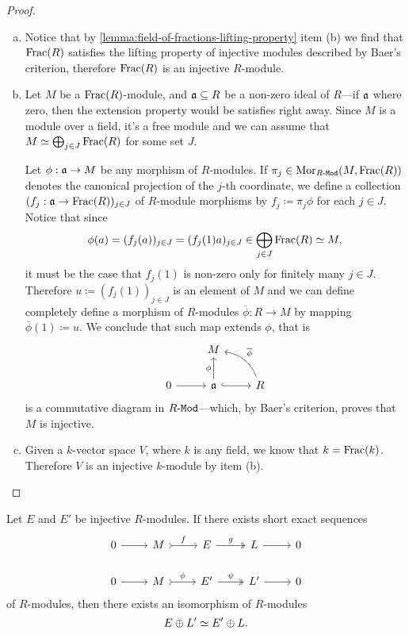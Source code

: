 \begin{proof}
\begin{enumerate}[(a)]\setlength\itemsep{0em}
\item Notice that by \cref{lemma:field-of-fractions-lifting-property} item (b)
  we find that \(\operatorname{Frac}(R)\) satisfies the lifting property of injective modules
  described by Baer's criterion, therefore \(\operatorname{Frac}(R)\) is an injective
  \(R\)-module.

\item Let \(M\) be a \(\operatorname{Frac}(R)\)-module, and \(\mathfrak{a} \subseteq R\) be a
  non-zero ideal of \(R\)---if \(\mathfrak{a}\) where zero, then the extension
  property would be satisfies right away. Since \(M\) is a module over a field,
  it's a free module and we can assume that
  \(M \simeq \bigoplus_{j \in J} \operatorname{Frac}(R)\) for some set \(J\).

  Let \(\phi: \mathfrak{a} \to M\) be any morphism of \(R\)-modules. If
  \(\pi_j \in \operatorname{Mor}_{{R\text{-}\texttt{Mod}}}(M, \operatorname{Frac}(R))\) denotes the canonical projection of
  the \(j\)-th coordinate, we define a collection
  \((f_j: \mathfrak{a} \to \operatorname{Frac}(R))_{j \in J}\) of \(R\)-module morphisms by
  \(f_j \coloneq \pi_j \phi\) for each \(j \in J\). Notice that since
  \[
  \phi(a) = (f_j(a))_{j \in J} = (f_j(1) a)_{j \in J}
  \in \bigoplus_{j \in J} \operatorname{Frac}(R) \simeq M,
  \]
  it must be the case that \(f_j(1)\) is non-zero only for finitely many
  \(j \in J\). Therefore \(u \coloneq (f_j(1))_{j \in J}\) is an element of
  \(M\) and we can define completely define a morphism of \(R\)-modules
  \(\overline{\phi}: R \to M\) by mapping \(\overline{\phi}(1) \coloneq u\). We
  conclude that such map extends \(\phi\), that is
  \[
  \begin{tikzcd}
  &M & \\
  0 \ar[r] &\ideal a \ar[r, hook] \ar[u, "\phi"]
  &R \ar[lu, bend right, "\overline{\phi}"']
  \end{tikzcd}
  \]
  is a commutative diagram in \({R\text{-}\texttt{Mod}}\)---which, by Baer's criterion, proves
  that \(M\) is injective.

\item Given a \(k\)-vector space \(V\), where \(k\) is any field, we know that
  \(k = \operatorname{Frac}(k)\). Therefore \(V\) is an injective \(k\)-module by item (b).
\end{enumerate}
\end{proof}

\begin{proposition}
\label{prop:schanuel-lemma-dual}
Let \(E\) and \(E'\) be injective \(R\)-modules. If there exists short exact
sequences
\[
\begin{tikzcd}
0 \ar[r] &M \ar[r, tail, "f"] &E \ar[r, two heads, "g"] &L \ar[r] &0
\\
0 \ar[r] &M \ar[r, tail, "\phi"] &E' \ar[r, two heads, "\psi"] &L' \ar[r] &0
\end{tikzcd}
\]
of \(R\)-modules, then there exists an isomorphism of \(R\)-modules
\[
E \oplus L' \simeq E' \oplus L.
\]
\end{proposition}

